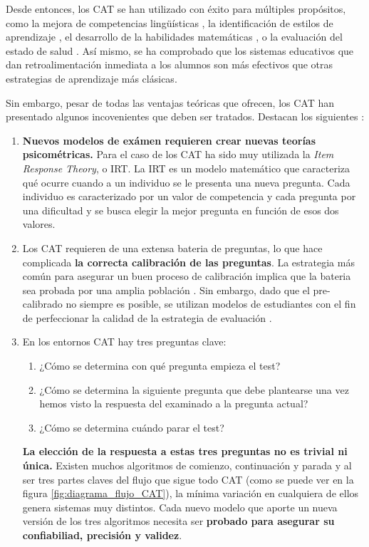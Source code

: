 Desde entonces, los \acrshort{CAT} se han utilizado con éxito para múltiples propósitos, como la mejora de competencias lingüísticas \cite{Chapelle06}, la identificación de estilos de aprendizaje \cite{Ortigosa10}, el desarrollo de la habilidades matemáticas \cite{Klinkenberg11}, o la evaluación del estado de salud \cite{Revicki97}. Así mismo, se ha comprobado que los sistemas educativos que dan retroalimentación inmediata a los alumnos son más efectivos que otras estrategias de aprendizaje más clásicas\cite{Kumar04}. 

Sin embargo, pesar de todas las ventajas teóricas que ofrecen, los \acrshort{CAT} han presentado algunos incovenientes que deben ser tratados. Destacan los siguientes \cite{Wainer00}:

\begin{enumerate}
 	\item \textbf{Nuevos modelos de exámen requieren crear nuevas teorías psicométricas.} Para el caso de los \acrshort{CAT} ha sido muy utilizada la \textit{Item Response Theory}, o \acrshort{IRT}. La \acrshort{IRT} es un modelo matemático que caracteriza qué ocurre cuando a un individuo se le presenta una nueva pregunta. Cada individuo es caracterizado por un valor de competencia y cada pregunta por una dificultad y se busca elegir la mejor pregunta en función de esos dos valores\cite{Wainer83}.
	\item Los \acrshort{CAT} requieren de una extensa bateria de preguntas, lo que hace complicada \textbf{la correcta calibración de las preguntas}. La estrategia más común para asegurar un buen proceso de calibración implica que la bateria sea probada por una amplia población \cite{Klinkenberg11}. Sin embargo, dado que el pre-calibrado no siempre es posible, se utilizan modelos de estudiantes con el fin de perfeccionar la calidad de la estrategia de evaluación \cite{Antal11}\cite{Galvez09}\cite{Molins14Test}.
	\item En los entornos \acrshort{CAT} hay tres preguntas clave:
	\begin{enumerate}
		\item ¿Cómo se determina con qué pregunta empieza el test?
		\item ¿Cómo se determina la siguiente pregunta que debe plantearse una vez hemos visto la respuesta del examinado a la pregunta actual?
		\item ¿Cómo se determina cuándo parar el test?
	\end{enumerate}
	\textbf{La elección de la respuesta a estas tres preguntas no es trivial ni única.} Existen muchos algoritmos de comienzo, continuación y parada y al ser tres partes claves del flujo que sigue todo \acrshort{CAT} (como se puede ver en la figura \ref{fig:diagrama_flujo_CAT}), la mínima variación en cualquiera de ellos genera sistemas muy distintos. Cada nuevo modelo que aporte un nueva versión de los tres algoritmos necesita ser \textbf{probado para asegurar su confiabiliad, precisión y validez}\cite{Wainer00}.
\end{enumerate}

